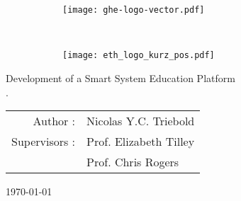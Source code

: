 \newpage%
\clearpage%
\begin{titlepage}%
    \begin{center}%
 	    \begin{figure}%
	        \centering%
            \begin{subfigure}[b]{0.7\textwidth}%
  	            \texttt{[image: ghe-logo-vector.pdf]}%
            \end{subfigure}%
            \\%
            \begin{subfigure}[b]{0.5\textwidth}%
                \texttt{[image: eth\_logo\_kurz\_pos.pdf]}%
            \end{subfigure}%
        \end{figure}%
        
		\vspace*{1cm}%
		
		{\LARGE Development of a Smart System Education Platform \\ . \par}%
			
		\vspace{1.0cm}%
        {\large\begin{tabular}{rl}
            Author : & Nicolas Y.C. Triebold \\
            Supervisors :& Prof. Elizabeth Tilley \\
                         & Prof. Chris Rogers \\
        \end{tabular}}%
		\vfill%
		\today%
	\end{center}%
\end{titlepage}%